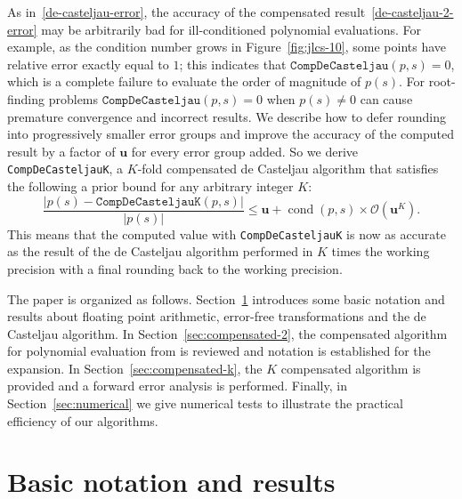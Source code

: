 \documentclass[letterpaper,10pt]{article}
\theoremstyle{definition}
\newcommand{\cond}[1]{\operatorname{cond}\left(#1\right)}
\newcommand{\mach}{\mathbf{u}}
\begin{document}
As in~\eqref{de-casteljau-error}, the accuracy of the compensated
result~\eqref{de-casteljau-2-error} may be arbitrarily bad for ill-conditioned
polynomial evaluations. For example, as the condition number grows in
Figure~\ref{fig:jlcs-10}, some points have relative error exactly equal to
\(1\); this indicates that \(\mathtt{CompDeCasteljau}(p, s) = 0\), which is
a complete failure to evaluate the order of magnitude of \(p(s)\). For
root-finding problems \(\mathtt{CompDeCasteljau}(p, s) = 0\) when
\(p(s) \neq 0\) can cause premature convergence and incorrect results.
We describe how to defer rounding into progressively
smaller error groups and improve the accuracy of the computed result by a
factor of \(\mach\) for every error group added. So we derive
\texttt{CompDeCasteljauK}, a \(K\)-fold compensated de Casteljau algorithm
that satisfies the following a prior bound for any arbitrary integer \(K\):
\begin{equation}
  \frac{\left|p(s) - \mathtt{CompDeCasteljauK}(p, s)\right|}{
    \left|p(s)\right|} \leq \mach + \cond{p, s} \times
    \mathcal{O}\left(\mach^K\right).
\end{equation}
This means that the computed value with \texttt{CompDeCasteljauK} is now
as accurate as the result of the de Casteljau algorithm performed in
\(K\) times the working precision with a final rounding back to the
working precision.

The paper is organized as follows. Section~\ref{sec:notation} introduces some
basic notation and results about floating point arithmetic, error-free
transformations and the de Casteljau algorithm. In
Section~\ref{sec:compensated-2},
the compensated algorithm for polynomial evaluation from \cite{Jiang2010} is
reviewed and notation is established for the expansion. In
Section~\ref{sec:compensated-k}, the \(K\) compensated algorithm is provided and
a forward error analysis is performed. Finally, in Section~\ref{sec:numerical} we
give numerical tests to illustrate the practical efficiency of our algorithms.

\section{Basic notation and results}\label{sec:notation}
\end{document}
